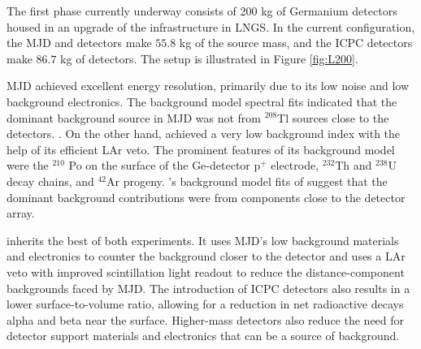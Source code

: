 The first phase currently underway consists of 200 kg of Germanium detectors housed in an upgrade of the {\Gerda} infrastructure in LNGS. In the current configuration, the MJD and {\Gerda} detectors make $55.8$ kg of the source mass, and the ICPC detectors make $86.7$ kg of detectors. The setup is illustrated in Figure \ref{fig:L200}. 

MJD achieved excellent energy resolution, primarily due to its low noise and low background electronics. The background model spectral fits indicated that the dominant background source in MJD was not from $^{208}$Tl sources close to the detectors. \cite{Buuck_thesis}. On the other hand, {\Gerda} achieved a very low background index with the help of its efficient LAr veto. The prominent features of its background model were the $^{210}$ Po on the surface of the Ge-detector p$^+$ electrode, $^{232}$Th and $^{238}$U decay chains, and $^{42}$Ar progeny. {\Gerda}'s background model fits of {\Gerda } suggest that the dominant background contributions \cite{GERDA_final} were from components close to the detector array.

{\Ltwo} inherits the best of both experiments. It uses MJD's low background materials and electronics to counter the background {\Gerda} closer to the detector and uses a LAr veto with improved scintillation light readout to reduce the distance-component backgrounds faced by MJD. The introduction of ICPC detectors also results in a lower surface-to-volume ratio, allowing for a reduction in net radioactive decays alpha and beta near the surface. Higher-mass detectors also reduce the need for detector support materials and electronics that can be a source of background. 

